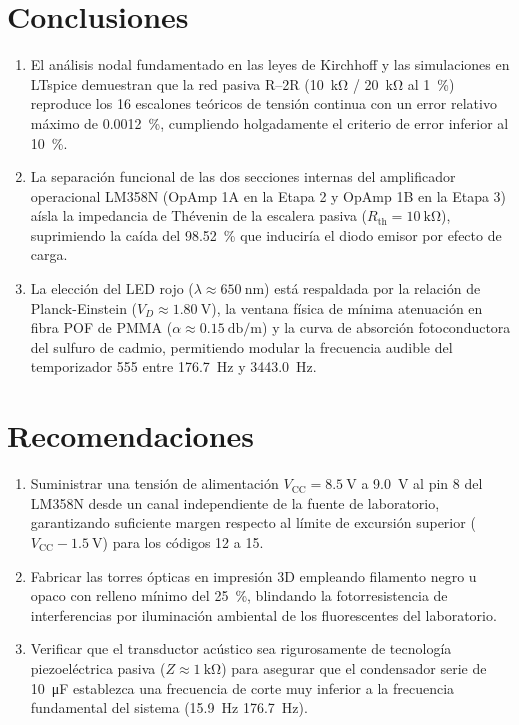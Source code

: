 \documentclass[journal,transmag]{IEEEtran}
\begin{document}
\section{Conclusiones}
\begin{enumerate}
\item El análisis nodal fundamentado en las leyes de Kirchhoff y las simulaciones en LTspice demuestran que la red pasiva R--2R (\SI{10}{\kilo\ohm} / \SI{20}{\kilo\ohm} al \SI{1}{\percent}) reproduce los 16 escalones teóricos de tensión continua con un error relativo máximo de \SI{0.0012}{\percent}, cumpliendo holgadamente el criterio de error inferior al \SI{10}{\percent}.
\item La separación funcional de las dos secciones internas del amplificador operacional LM358N (OpAmp 1A en la Etapa 2 y OpAmp 1B en la Etapa 3) aísla la impedancia de Thévenin de la escalera pasiva ($R_{\text{th}} = \SI{10}{\kilo\ohm}$), suprimiendo la caída del \SI{98.52}{\percent} que induciría el diodo emisor por efecto de carga.
\item La elección del LED rojo ($\lambda \approx \SI{650}{\nano\meter}$) está respaldada por la relación de Planck-Einstein ($V_D \approx \SI{1.80}{\volt}$), la ventana física de mínima atenuación en fibra POF de PMMA ($\alpha \approx \SI{0.15}{\decibel\per\meter}$) y la curva de absorción fotoconductora del sulfuro de cadmio, permitiendo modular la frecuencia audible del temporizador 555 entre \SI{176.7}{\hertz} y \SI{3443.0}{\hertz}.
\end{enumerate}

\section{Recomendaciones}
\begin{enumerate}
\item Suministrar una tensión de alimentación $V_{\text{CC}} = \SI{+8.5}{\volt}$ a \SI{+9.0}{\volt} al pin 8 del LM358N desde un canal independiente de la fuente de laboratorio, garantizando suficiente margen respecto al límite de excursión superior ($V_{\text{CC}} - \SI{1.5}{\volt}$) para los códigos 12 a 15.
\item Fabricar las torres ópticas en impresión 3D empleando filamento negro u opaco con relleno mínimo del \SI{25}{\percent}, blindando la fotorresistencia de interferencias por iluminación ambiental de los fluorescentes del laboratorio.
\item Verificar que el transductor acústico sea rigurosamente de tecnología piezoeléctrica pasiva ($Z \approx \SI{1}{\kilo\ohm}$) para asegurar que el condensador serie de \SI{10}{\micro\farad} establezca una frecuencia de corte muy inferior a la frecuencia fundamental del sistema (\SI{15.9}{\hertz} \ll \SI{176.7}{\hertz}).
\end{enumerate}
\end{document}
